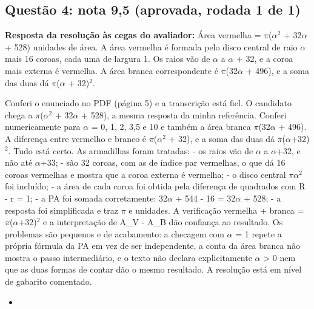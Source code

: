 \documentclass{article}%
\begin{document}
\subsection*{Questão 4: nota 9,5 (aprovada, rodada 1 de 1)}%
\textbf{Resposta da resolução às cegas do avaliador:} Área vermelha = $\pi$($\alpha$$^2$ + 32$\alpha$ + 528) unidades de área. A área vermelha é formada pelo disco central de raio $\alpha$ mais 16 coroas, cada uma de largura 1. Os raios vão de $\alpha$ a $\alpha$ + 32, e a coroa mais externa é vermelha. A área branca correspondente é $\pi$(32$\alpha$ + 496), e a soma das duas dá $\pi$($\alpha$ + 32)$^2$.\par %
Conferi o enunciado no PDF (página 5) e a transcrição está fiel. O candidato chega a $\pi$($\alpha$$^2$ + 32$\alpha$ + 528), a mesma resposta da minha referência. Conferi numericamente para $\alpha$ = 0, 1, 2, 3,5 e 10 e também a área branca $\pi$(32$\alpha$ + 496). A diferença entre vermelho e branco é $\pi$($\alpha$$^2$ + 32), e a soma das duas dá $\pi$($\alpha$+32)$^2$. Tudo está certo.\newline%
\newline%
As armadilhas foram tratadas:\newline%
{-} os raios vão de $\alpha$ a $\alpha$+32, e não até $\alpha$+33;\newline%
{-} são 32 coroas, com as de índice par vermelhas, o que dá 16 coroas vermelhas e mostra que a coroa externa é vermelha;\newline%
{-} o disco central $\pi$$\alpha$$^2$ foi incluído;\newline%
{-} a área de cada coroa foi obtida pela diferença de quadrados com R - r = 1;\newline%
{-} a PA foi somada corretamente: 32$\alpha$ + 544 - 16 = 32$\alpha$ + 528;\newline%
{-} a resposta foi simplificada e traz $\pi$ e unidades.\newline%
\newline%
A verificação vermelha + branca = $\pi$($\alpha$+32)$^2$ e a interpretação de A\_V - A\_B dão confiança ao resultado. Os problemas são pequenos e de acabamento: a checagem com $\alpha$ = 1 repete a própria fórmula da PA em vez de ser independente, a conta da área branca não mostra o passo intermediário, e o texto não declara explicitamente $\alpha$ > 0 nem que as duas formas de contar dão o mesmo resultado. A resolução está em nível de gabarito comentado.%
\begin{itemize}%
\item%

\end{itemize}$$
\end{document}
